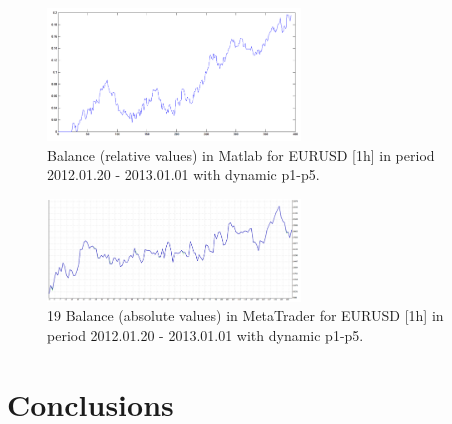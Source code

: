 \documentclass[runningheads,a4paper]{llncs}
\begin{document}
\begin{figure}[h!]
\centering
\includegraphics[width = 0.6\textwidth]{figures/rys18.png}
\caption{Balance (relative values) in Matlab for EURUSD [1h] in period 2012.01.20 - 2013.01.01 with dynamic p1-p5.}
\label{fig:fig18}
\end{figure}
\FloatBarrier
\begin{figure}[h!]
\centering
\includegraphics[width = 0.6\textwidth]{figures/rys19.png}
\caption{19 Balance (absolute values) in MetaTrader for EURUSD [1h] in period 2012.01.20 - 2013.01.01 with dynamic p1-p5.}
\label{fig:fig19}
\end{figure}
\FloatBarrier

\section{Conclusions}
\end{document}
